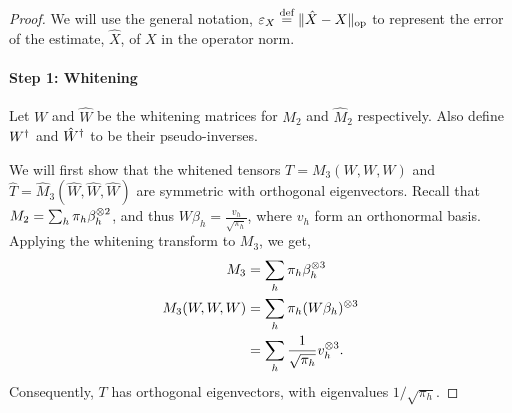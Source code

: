 \documentclass[tablecaption=bottom]{jmlr}
\newcommand\eqdef{\ensuremath{\stackrel{\textrm{def}}{=}}} %
\newcommand{\Lop}{\textrm{op}}
\begin{document}
\begin{proof}
We will use the general notation, $\aerr{X} \eqdef \|\hat X - X\|_\Lop$
to represent the error of the estimate, $\hat X$, of $X$ in the operator
norm. 
\paragraph{Step 1: Whitening}
Let $W$ and $\hat W$ be the whitening matrices for $M_2$ and $\hat M_2$
respectively. Also define $W^{\dagger}$ and ${\hat W}^{\dagger}$ to be their
pseudo-inverses.

We will first show that the whitened tensors $T = M_3(W,W,W)$ and $\hat
T = \hat M_3(\hat W, \hat W, \hat W)$ are symmetric with orthogonal
eigenvectors. Recall that $M_2 = \sum_h \pi_h \beta_h^{\otimes 2}$, and thus
$W \beta_h = \frac{v_h}{\sqrt{\pi_h}}$, where $v_h$ form an orthonormal
basis. Applying the whitening transform to $M_3$, we get, 
\begin{align}
  M_3 &= \sum_h \pi_h \beta_h^{\otimes 3} \\
  M_3(W,W,W) &= \sum_h \pi_h (W\beta_h)^{\otimes 3} \\
  &= \sum_h \frac{1}{\sqrt{\pi_h}} v_h^{\otimes 3}.
\end{align}
Consequently, $T$ has orthogonal eigenvectors, with eigenvalues $1/\sqrt{\pi_h}$.


\end{proof}
\end{document}
